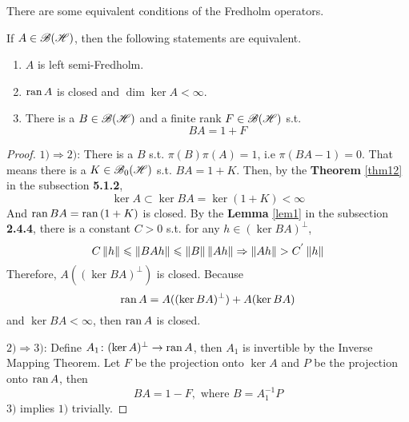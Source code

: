 \documentclass[a4paper,11pt]{report}
\begin{document}
There are some equivalent conditions of the Fredholm operators.
\begin{thm}
	If $A \in \mathscr{B(H)}$, then the following statements are equivalent.
	\begin{enumerate}[label = \arabic*)]
		\item $A$ is left semi-Fredholm.
		\item $\operatorname{ran}{A}$ is closed and $\dim{\ker{A}} < \infty$.
		\item There is a $B \in \mathscr{B(H)}$ and a finite rank $F \in \mathscr{B(H)}$ s.t.
		\begin{equation*}
			BA = 1 + F
		\end{equation*}
	\end{enumerate}
\end{thm}
\begin{proof}
	$1) \Rightarrow 2)$: There is a $B$ s.t. $\pi(B)\pi(A) = 1$, i.e $\pi(BA-1) = 0$. That means there is a $K \in \mathscr{B}_{0}\mathscr{(H)}$ s.t. $BA = 1 + K$. Then, by the \textbf{Theorem} \ref{thm12} in the subsection \textbf{5.1.2},
	\begin{equation*}
		\ker{A} \subset \ker{BA} = \ker{(1+K)} < \infty
	\end{equation*}
	And $\operatorname{ran}{BA} = \operatorname{ran}{(1+K)}$ is closed. By the \textbf{Lemma} \ref{lem1} in the subsection \textbf{2.4.4}, there is a constant $C > 0$ s.t. for any $h \in (\ker{BA})^{\bot}$, 
	\begin{equation*}
		C\left\lVert h\right\lVert \leqslant \left\lVert BAh\right\lVert \leqslant \left\lVert B\right\lVert\left\lVert Ah\right\lVert \Rightarrow \left\lVert Ah\right\lVert > C^{'}\left\lVert h\right\lVert
	\end{equation*}
	Therefore, $A((\ker{BA})^{\bot})$ is closed. Because
	\begin{equation*}
		\operatorname{ran}{A} = A((\ker{BA})^{\bot}) + A(\ker{BA})
	\end{equation*}
	and $\ker{BA} < \infty$, then $\operatorname{ran}{A}$ is closed.
	\item $2) \Rightarrow 3)$: Define $A_1 \colon (\ker{A})^{\bot} \rightarrow \operatorname{ran}{A}$, then $A_1$ is invertible by the Inverse Mapping Theorem. Let $F$ be the projection onto $\ker{A}$ and $P$ be the projection onto $\operatorname{ran}{A}$, then
	\begin{equation*}
		BA = 1 - F, \text{ where } B = A_1^{-1}P
	\end{equation*}
	$3)$ implies $1)$ trivially.
\end{proof}
\end{document}
